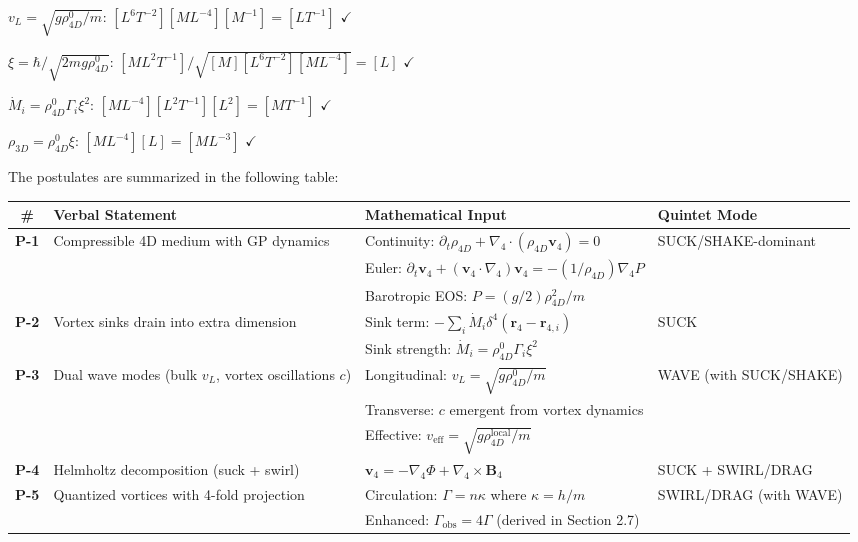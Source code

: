 \begin{tcolorbox}[title=Dimensional Check]
$v_L = \sqrt{g \rho_{4D}^0 / m}$: $[L^6 T^{-2}] [M L^{-4}] [M^{-1}] = [L T^{-1}]$ $\checkmark$

$\xi = \hbar / \sqrt{2 m g \rho_{4D}^0}$: $[M L^2 T^{-1}] / \sqrt{[M] [L^6 T^{-2}] [M L^{-4}]} = [L]$ $\checkmark$

$\dot{M}_i = \rho_{4D}^0 \Gamma_i \xi^2$: $[M L^{-4}] [L^2 T^{-1}] [L^2] = [M T^{-1}]$ $\checkmark$

$\rho_{3D} = \rho_{4D}^0 \xi$: $[M L^{-4}] [L] = [M L^{-3}]$ $\checkmark$
\end{tcolorbox}

The postulates are summarized in the following table:

\begin{table}[H]
\centering
\begin{tabularx}{\textwidth}{|c|Y|Y|Y|}
\hline
\# & Verbal Statement & Mathematical Input & Quintet Mode \\
\hline
\textbf{P-1} & Compressible 4D medium with GP dynamics & Continuity: $\partial_t \rho_{4D} + \nabla_4 \cdot (\rho_{4D} \mathbf{v}_4) = 0$ & SUCK/SHAKE-dominant \\
& & Euler: $\partial_t \mathbf{v}_4 + (\mathbf{v}_4 \cdot \nabla_4) \mathbf{v}_4 = -(1/\rho_{4D}) \nabla_4 P$ &  \\
& & Barotropic EOS: $P = (g/2) \rho_{4D}^2 / m$ &  \\
\hline
\textbf{P-2} & Vortex sinks drain into extra dimension & Sink term: $-\sum_i \dot{M}_i \delta^4(\mathbf{r}_4 - \mathbf{r}_{4,i})$ & SUCK \\
& & Sink strength: $\dot{M}_i = \rho_{4D}^0 \Gamma_i \xi^2$ &  \\
\hline
\textbf{P-3} & Dual wave modes (bulk $v_L$, vortex oscillations $c$) & Longitudinal: $v_L = \sqrt{g \rho_{4D}^0 / m}$ & WAVE (with SUCK/SHAKE) \\
& & Transverse: $c$ emergent from vortex dynamics &  \\
& & Effective: $v_{\text{eff}} = \sqrt{g \rho_{4D}^{\text{local}} / m}$ &  \\
\hline
\textbf{P-4} & Helmholtz decomposition (suck + swirl) & $\mathbf{v}_4 = -\nabla_4 \Phi + \nabla_4 \times \mathbf{B}_4$ & SUCK + SWIRL/DRAG \\
\hline
\textbf{P-5} & Quantized vortices with 4-fold projection & Circulation: $\Gamma = n \kappa$ where $\kappa = h / m$ & SWIRL/DRAG (with WAVE) \\
& & Enhanced: $\Gamma_{\text{obs}} = 4 \Gamma$ (derived in Section 2.7) &  \\

\end{tabularx}
\end{table}

